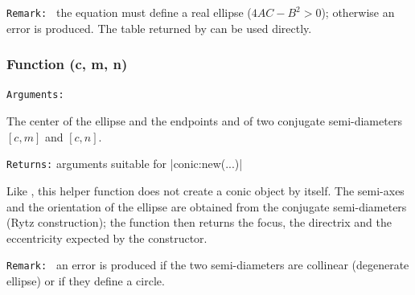 \medskip
\texttt{Remark: } the equation must define a real ellipse ($4AC - B^2 > 0$);
otherwise an error is produced. The table returned by
 can be used directly.

\begin{tkzexample}[latex= .4\textwidth]
\begin{center}
\end{center}
\end{tkzexample}

\subsubsection{Function (c, m, n)}
\label{ssub:function_el_conjugate}

\texttt{Arguments: }

The center  of the ellipse and the endpoints  and  of two
conjugate semi-diameters $[c, m]$ and $[c, n]$.

\medskip
\texttt{Returns:} arguments suitable for |conic:new(...)|

Like , this helper function does not create
a conic object by itself. The semi-axes and the orientation of the ellipse are
obtained from the conjugate semi-diameters (Rytz construction); the function
then returns the focus, the directrix and the eccentricity expected by the
constructor.

\medskip
\texttt{Remark: } an error is produced if the two semi-diameters are collinear
(degenerate ellipse) or if they define a circle.

\begin{tkzexample}[latex= .4\textwidth]
\begin{center}
\end{center}
\end{tkzexample}

